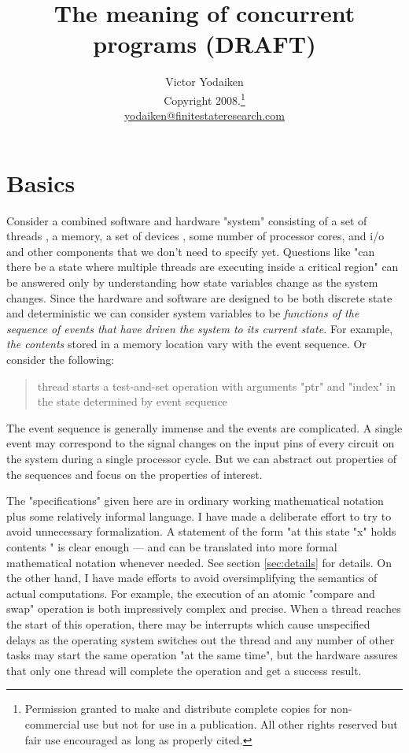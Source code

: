 \documentclass[english,11pt]{article}
\title{ The meaning of concurrent programs (DRAFT)}
\author{Victor Yodaiken\\
{\small Copyright 2008.\footnote{Permission granted to make and distribute
complete copies for non-commercial use but not for use in a publication. All other
rights reserved but fair use encouraged as long as properly cited.}}\\
\url{yodaiken@finitestateresearch.com}}
\begin{document}
\maketitle


\section{Basics}

Consider a combined software and hardware "system" consisting of a set of threads , a memory, a set
of devices , some 
number of processor cores, and i/o and other components that we don't need to specify yet. 
Questions like "can there be a state where multiple threads are executing inside a critical region"
can be answered only
by understanding how state variables change as the system changes. Since the hardware and software are
designed to be both discrete state and deterministic
we can
consider system variables to be \emph{functions of the sequence of events that have driven the system to
its current state.} For example, \emph{the contents} stored in a memory location
vary with the event sequence. Or consider the following: 
 \begin{quote}{thread  starts a test-and-set operation
with arguments "ptr"  and "index"  in the state determined by event sequence }\end{quote}
The event sequence is generally immense and the events are complicated. A single event may
correspond to the signal changes on the input pins of every circuit on the system during a single processor
cycle. But we can abstract out properties of the sequences and focus on the
properties of interest.

The "specifications" given here are in ordinary working mathematical notation plus some relatively informal
language. I have made a deliberate effort to try to avoid unnecessary formalization. A statement
of the form "at this state "x" holds contents " is clear enough --- and can be translated into more formal
mathematical notation whenever needed. See section \ref{sec:details} for details.
On the other hand, I have made efforts to avoid oversimplifying the 
semantics of actual computations. For example, the execution of an atomic "compare and swap" operation is
both impressively complex and precise. When a thread reaches the start of this operation, there may be interrupts
which cause unspecified delays as the operating system switches out the thread and any number of other tasks
may start the same operation "at the same time", but the hardware assures that only one thread will complete
the operation and get a success result. 
\end{document}
